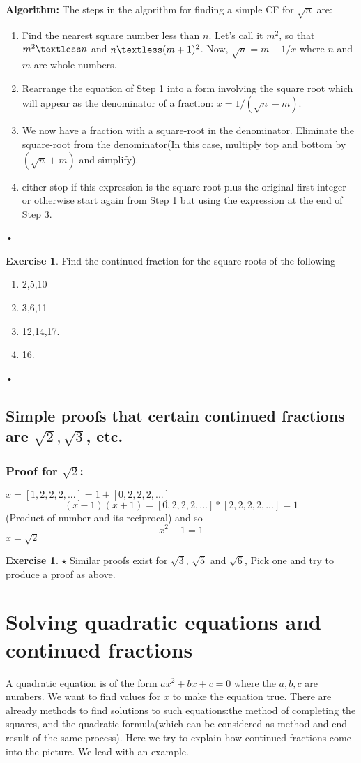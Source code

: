 \documentclass[12pt]{amsart}
\theoremstyle{definition}
\newtheorem{xca}[theorem]{Exercise}
\theoremstyle{remark}
\numberwithin{equation}{section}
\begin{document}
\textbf{Algorithm:} The steps in the algorithm for finding a simple CF for $\sqrt{n}$ are:
\begin{enumerate}
\item Find the nearest square number less than $n$. Let's call it $m^2$, so that $m^2\textless n$ and $n\textless (m+1)^2$. Now, $\sqrt{n} = m + 1/x$ where $n$ and $m$ are whole numbers.
\item Rearrange the equation of Step 1 into a form involving the square root which will appear as the denominator of a fraction: $x = 1 / (\sqrt{n} - m)$.
\item We now have a fraction with a square-root in the denominator. Eliminate the square-root from the denominator(In this case, multiply top and bottom by $(\sqrt{n} + m)$ and simplify).
\item either stop if this expression is the square root plus the original first integer or otherwise start again from Step 1 but using the expression at the end of Step 3. 
\end{enumerate}•	

\begin{xca}
Find the continued fraction for the square roots of the following 
\begin{enumerate}
\item 2,5,10
\item 3,6,11
\item 12,14,17.
\item 16.
\end{enumerate}•
\end{xca}
\subsection{Simple proofs that certain continued fractions are $\sqrt{2}, \sqrt{3}$, etc.}
 \subsubsection{Proof for $\sqrt{2}$:}
$x = [1, 2, 2, 2, ...]= 1+[0, 2, 2, 2, ...]$
\[(x-1) (x+1) = [0, 2, 2, 2, ...] * [2, 2, 2, 2, ...] =  1\] (Product of number and its reciprocal)
and so
\[x^2- 1 = 1\]
$x = \sqrt{2}$

\begin{xca}$\star$
Similar proofs exist for $\sqrt{3}$, $\sqrt{5}$ and $\sqrt{6}$, Pick one and try to produce a proof as above.\end{xca}

\section{Solving quadratic equations and continued fractions}
A quadratic equation is of the form $a x^2 + b x + c= 0$ where the $a,b,c$ are numbers. We want to find values for $x$ to make the equation true. There are already methods to find solutions to such equations:the method of completing the squares, and the quadratic formula(which can be considered as method and end result of the same process). Here we try to explain how continued fractions come into the picture. We lead with an example.
\end{document}
